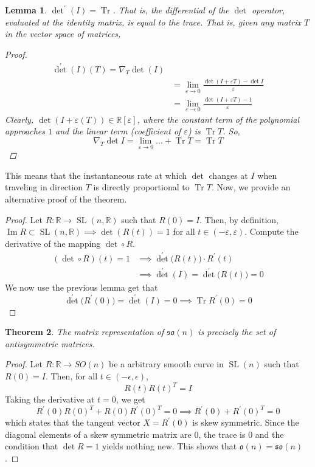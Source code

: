 \documentclass{article}
\DeclareMathOperator{\Tr}{Tr}
\DeclareMathOperator{\im}{Im}
\DeclareMathOperator{\SL}{SL}
\newtheorem{theorem}{Theorem}[section]
\newtheorem{lemma}[theorem]{Lemma}
\theoremstyle{remark}
\theoremstyle{definition}
\begin{document}
\begin{lemma}
$\det^\prime (I) = \Tr$. That is, the differential of the $\det$ operator, evaluated at the identity matrix, is equal to the trace. That is, given any matrix $T$ in the vector space of matrices, 
\begin{proof}
\begin{align*}
    \det^\prime (I) (T) = \nabla_T \det(I) \\
    & = \lim_{\varepsilon \rightarrow 0} \frac{\det{(I + \varepsilon T)} - \det{I}}{\varepsilon} \\
    & = \lim_{\varepsilon \rightarrow 0} \frac{\det{(I + \varepsilon T)} - 1}{\varepsilon}
\end{align*}
Clearly, $\det(I + \varepsilon(T)) \in \mathbb{R}[\varepsilon]$, where the constant term of the polynomial approaches $1$ and the linear term (coefficient of $\varepsilon$) is $\Tr{T}$. So, 
\[\nabla_T \det{I} = \lim_{\varepsilon \rightarrow 0} ... + \Tr{T} = \Tr{T}\]
\end{proof}
\end{lemma}
This means that the instantaneous rate at which $\det$ changes at $I$ when traveling in direction $T$ is directly proportional to $\Tr{T}$. Now, we provide an alternative proof of the theorem. 
\begin{proof}
Let $R: \mathbb{R} \longrightarrow \SL(n, \mathbb{R})$ such that $R(0) = I$. Then, by definition, $\im{R} \subset \SL(n, \mathbb{R}) \implies \det{(R(t))} = 1$ for all $t \in (-\varepsilon, \varepsilon)$. Compute the derivative of the mapping $\det \circ R$. 
\begin{align*}
    (\det \circ  R) (t) = 1 & \implies \det^\prime \big( R(t) \big) \cdot R^\prime (t) \\ 
    & \implies \det^\prime (I) = \det^\prime \big(R(t)\big) = 0 
\end{align*}
We now use the previous lemma get that 
\[\det^\prime \big( R^\prime(0)\big) = \det^\prime (I)=0 \implies \Tr{R^\prime(0)} = 0\]
\end{proof} 

\begin{theorem}
The matrix representation of $\mathfrak{so}(n)$ is precisely the set of antisymmetric matrices. 
\end{theorem}
\begin{proof}
Let $R: \mathbb{R} \longrightarrow SO(n)$ be a arbitrary smooth curve in $\SL(n)$ such that $R(0) = I$. Then, for all $t \in (-\epsilon, \epsilon)$, 
\[R(t) R(t)^T = I\]
Taking the derivative at $t = 0$, we get
\[R^\prime (0) R(0)^T + R(0) R^\prime(0)^T = 0 \implies R^\prime (0) + R^\prime(0)^T = 0\]
which states that the tangent vector $X = R^\prime (0)$ is skew symmetric. Since the diagonal elements of a skew symmetric matrix are $0$, the trace is $0$ and the condition that $\det{R} = 1$ yields nothing new. This shows that $\mathfrak{o}(n) = \mathfrak{so}(n)$. 
\end{proof}
\end{document}
